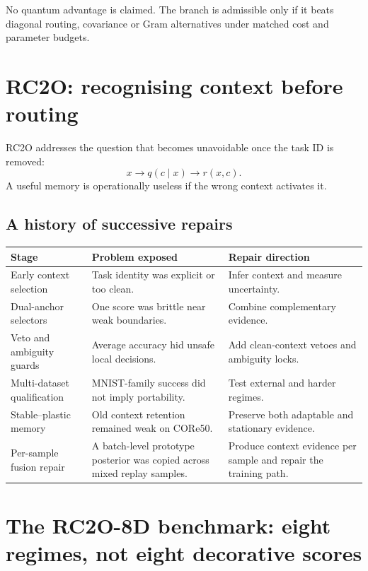 \documentclass[11pt,a4paper]{article}
\newcommand{\tablehead}[1]{\cellcolor{DeepTeal}\color{white}\bfseries #1}
\begin{document}
\begin{statusbox}
No quantum advantage is claimed. The branch is admissible only if it beats diagonal routing, covariance or Gram alternatives under matched cost and parameter budgets.
\end{statusbox}

\newpage
\section{RC2O: recognising context before routing}

RC2O addresses the question that becomes unavoidable once the task ID is removed:
\[
x\rightarrow q(c\mid x)\rightarrow r(x,c).
\]
A useful memory is operationally useless if the wrong context activates it.

\subsection{A history of successive repairs}

\begin{tabularx}{\textwidth}{p{2.2cm}X X}
\toprule
\tablehead{Stage} & \tablehead{Problem exposed} & \tablehead{Repair direction}\\
\midrule
Early context selection & Task identity was explicit or too clean. & Infer context and measure uncertainty.\\
Dual-anchor selectors & One score was brittle near weak boundaries. & Combine complementary evidence.\\
Veto and ambiguity guards & Average accuracy hid unsafe local decisions. & Add clean-context vetoes and ambiguity locks.\\
Multi-dataset qualification & MNIST-family success did not imply portability. & Test external and harder regimes.\\
Stable--plastic memory & Old context retention remained weak on CORe50. & Preserve both adaptable and stationary evidence.\\
Per-sample fusion repair & A batch-level prototype posterior was copied across mixed replay samples. & Produce context evidence per sample and repair the training path.\\
\bottomrule
\end{tabularx}

\section{The RC2O-8D benchmark: eight regimes, not eight decorative scores}
\end{document}
